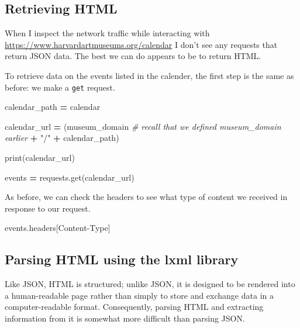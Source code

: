 \documentclass[
]{book}
\newenvironment{Shaded}{\begin{snugshade}}{\end{snugshade}}
\newcommand{\BuiltInTok}[1]{#1}
\newcommand{\CommentTok}[1]{\textcolor[rgb]{0.56,0.35,0.01}{\textit{#1}}}
\newcommand{\NormalTok}[1]{#1}
\newcommand{\OperatorTok}[1]{\textcolor[rgb]{0.81,0.36,0.00}{\textbf{#1}}}
\newcommand{\StringTok}[1]{\textcolor[rgb]{0.31,0.60,0.02}{#1}}
\begin{document}
\hypertarget{retrieving-html}{%
\subsection{Retrieving HTML}\label{retrieving-html}}

When I inspect the network traffic while interacting with \url{https://www.harvardartmuseums.org/calendar} I don't see any requests that return JSON data. The best we can do appears to be to return HTML.

To retrieve data on the events listed in the calender, the first step is the same as before: we make a \texttt{get} request.

\begin{Shaded}
\begin{Highlighting}[]
\NormalTok{calendar\_path }\OperatorTok{=} \StringTok{\textquotesingle{}calendar\textquotesingle{}}

\NormalTok{calendar\_url }\OperatorTok{=}\NormalTok{ (museum\_domain }\CommentTok{\# recall that we defined museum\_domain earlier}
                  \OperatorTok{+} \StringTok{"/"}
                  \OperatorTok{+}\NormalTok{ calendar\_path)}

\BuiltInTok{print}\NormalTok{(calendar\_url)}

\NormalTok{events }\OperatorTok{=}\NormalTok{ requests.get(calendar\_url)}
\end{Highlighting}
\end{Shaded}

As before, we can check the headers to see what type of content we received in response to our request.

\begin{Shaded}
\begin{Highlighting}[]
\NormalTok{events.headers[}\StringTok{\textquotesingle{}Content{-}Type\textquotesingle{}}\NormalTok{]}
\end{Highlighting}
\end{Shaded}

\hypertarget{parsing-html-using-the-lxml-library}{%
\subsection{Parsing HTML using the lxml library}\label{parsing-html-using-the-lxml-library}}

Like JSON, HTML is structured; unlike JSON, it is designed to be rendered into a human-readable page rather than simply to store and exchange data in a computer-readable format. Consequently, parsing HTML and extracting information from it is somewhat more difficult than parsing JSON.
\end{document}
